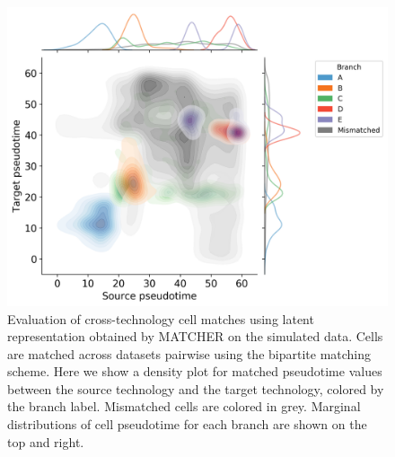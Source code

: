 
\begin{figure}[htp]
    \centering
    \includegraphics[width=1.0\textwidth]{figures/integration/matcher-pseudotime-kde.png}
    \caption{
    Evaluation of cross-technology cell matches using latent representation obtained by MATCHER on the simulated data.
    Cells are matched across datasets pairwise using the bipartite matching scheme.
    Here we show a density plot for matched pseudotime values between the source technology and the target technology,
    colored by the branch label. Mismatched cells are colored in grey.
    Marginal distributions of cell pseudotime for each branch are shown on the top and right.
    }
    \label{fig:prosstt5-matcher-psuedotime}
\end{figure}
